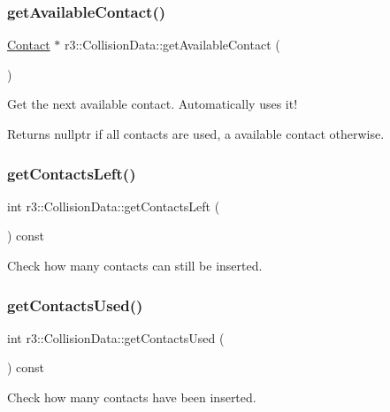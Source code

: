 \subsubsection{\texorpdfstring{get\+Available\+Contact()}{getAvailableContact()}}
{\footnotesize\ttfamily \mbox{\hyperlink{classr3_1_1_contact}{Contact}} $\ast$ r3\+::\+Collision\+Data\+::get\+Available\+Contact (\begin{DoxyParamCaption}{ }\end{DoxyParamCaption})}

Get the next available contact. Automatically uses it! \begin{DoxyReturn}{Returns}
nullptr if all contacts are used, a available contact otherwise. 
\end{DoxyReturn}
\mbox{\label{classr3_1_1_collision_data_a13e8ade4bbbbc63a1437de9371fea879}} 
\subsubsection{\texorpdfstring{get\+Contacts\+Left()}{getContactsLeft()}}
{\footnotesize\ttfamily int r3\+::\+Collision\+Data\+::get\+Contacts\+Left (\begin{DoxyParamCaption}{ }\end{DoxyParamCaption}) const}

Check how many contacts can still be inserted. \mbox{\label{classr3_1_1_collision_data_aaf0e65914133cd35cc32224df851561e}} 
\subsubsection{\texorpdfstring{get\+Contacts\+Used()}{getContactsUsed()}}
{\footnotesize\ttfamily int r3\+::\+Collision\+Data\+::get\+Contacts\+Used (\begin{DoxyParamCaption}{ }\end{DoxyParamCaption}) const}

Check how many contacts have been inserted. \mbox{\label{classr3_1_1_collision_data_acb1bb23e8d0f37f0ebc39e8f7642419f}} 
